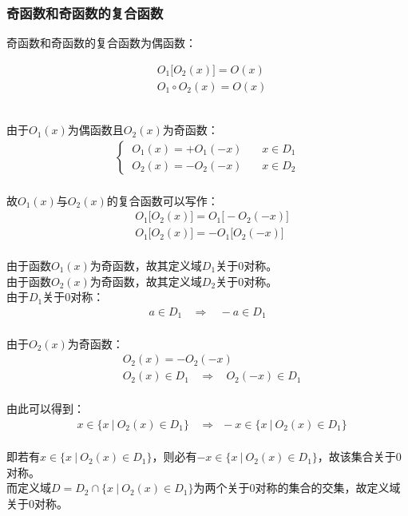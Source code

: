 \documentclass[UTF8]{ctexart}
\begin{document}
\newpage

\subsubsection{奇函数和奇函数的复合函数}
    \setcounter{equation}{0}
    奇函数和奇函数的复合函数为偶函数：
    \begin{large}
        \begin{align*}
            &O_1\big[O_2(x)\big]=O(x)\\[3mm]
            &O_1\circ O_2(x)=O(x)
        \end{align*}
    \end{large}\\
    由于$O_1(x)$为偶函数且$O_2(x)$为奇函数：
    \begin{align}
        \begin{cases}
            ~O_1(x)=+O_1(-x)~~~~~~~~x\in D_1\\[1mm]
            ~O_2(x)=-O_2(-x)~~~~~~~~x\in D_2
        \end{cases}
    \end{align}\\[3mm]
    故$O_1(x)$与$O_2(x)$的复合函数可以写作：
    \begin{align}
        &O_1\big[O_2(x)\big]=O_1\big[-O_2(-x)\big]\\[5mm]
        &O_1\big[O_2(x)\big]=-O_1\big[O_2(-x)\big]
    \end{align}\\
    由于函数$O_1(x)$为奇函数，故其定义域$D_1$关于$0$对称。\\[3mm]
    由于函数$O_2(x)$为奇函数，故其定义域$D_2$关于$0$对称。\\[3mm]
    由于$D_1$关于$0$对称：
    \begin{align}
        a\in D_1~~~~\Longrightarrow~~~~-a\in D_1
    \end{align}\\
    由于$O_2(x)$为奇函数：
    \begin{align}
        &O_2(x)=-O_2(-x)\\[5mm]
        &O_2(x)\in D_1~~~~\Longrightarrow~~~~O_2(-x)\in D_1
    \end{align}\\
    由此可以得到：
    \begin{align}
        &x\in\big\{x~|~O_2(x)\in D_1\big\}~~~~\Longrightarrow~~-x\in\big\{x~|~O_2(x)\in D_1\big\}
    \end{align}\\
    即若有$x\in\big\{x~|~O_2(x)\in D_1\big\}$，则必有$-x\in\big\{x~|~O_2(x)\in D_1\big\}$，故该集合关于$0$对称。\\[3mm]
    而定义域$D=D_2\cap\big\{x~|~O_2(x)\in D_1\big\}$为两个关于$0$对称的集合的交集，故定义域关于$0$对称。
\end{document}

